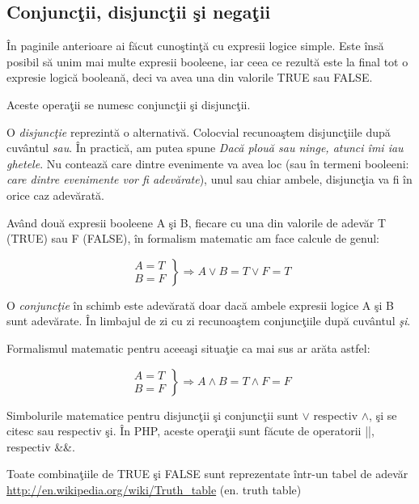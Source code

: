 \subsection{Conjuncţii, disjuncţii şi negaţii}
În paginile anterioare ai făcut cunoştinţă cu expresii logice
simple. Este însă posibil să unim mai multe expresii booleene,
iar ceea ce rezultă este la final tot o expresie logică booleană,
deci va avea una din valorile TRUE sau FALSE.

Aceste operaţii se numesc conjuncţii şi disjuncţii.

O \textsl{disjuncţie}
reprezintă o alternativă. Colocvial recunoaştem disjuncţiile
după cuvântul \textit{sau}. În practică, am putea spune
\textit{Dacă plouă sau ninge, atunci îmi iau ghetele}. Nu contează
care dintre evenimente va avea loc (sau în termeni booleeni: \textit{care dintre
evenimente {\glqq}vor fi adevărate{\grqq}}), unul sau chiar ambele, disjuncţia
va fi în orice caz adevărată.

Având două expresii booleene A şi B, fiecare cu una din valorile de
adevăr T (TRUE) sau F (FALSE), în formalism matematic am face calcule de genul:

\[ 
  \left.
  \begin{array}{c}
    A = T\\
    B = F
  \end{array}
  \right\}
  \Rightarrow A \lor B = T \lor F = T
\]

O \textsl{conjuncţie} în schimb este adevărată doar dacă ambele expresii logice A şi B
sunt adevărate. În limbajul de zi cu zi recunoaştem conjuncţiile după cuvântul \textit{şi}.

Formalismul matematic pentru aceeaşi situaţie ca mai sus ar arăta astfel:

\[ 
  \left.
  \begin{array}{c}
    A = T\\
    B = F
  \end{array}
  \right\}
  \Rightarrow A \land B = T \land F = F
\]

Simbolurile matematice pentru disjuncţii şi conjuncţii sunt $\lor$ respectiv $\land$, şi se citesc
{\glqq}sau{\grqq} respectiv {\glqq}şi{\grqq}. În PHP, aceste operaţii sunt făcute de operatorii {\glqq}||{\grqq}, respectiv {\glqq}\&\&{\grqq}.

Toate combinaţiile de TRUE şi FALSE sunt reprezentate într-un tabel de adevăr \label{tbl:truth table and or}\url{http://en.wikipedia.org/wiki/Truth_table} (en. truth table)

